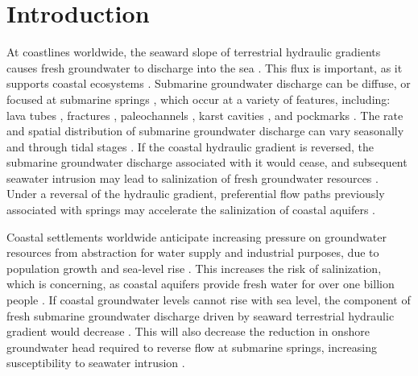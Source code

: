 \documentclass[pdflatex,sn-apa]{sn-jnl}%
\begin{document}
\section{Introduction}

At coastlines worldwide, the seaward slope of terrestrial hydraulic gradients causes fresh groundwater to discharge into the sea \citep{arevalo-martinez_ideas_2023, taniguchi_submarine_2019, moore_effect_2010}.
This flux is important, as it supports coastal ecosystems \citep{burnett_groundwater_2003, moore_effect_2010}.
Submarine groundwater discharge can be diffuse, or focused at submarine springs \citep{taniguchi_submarine_2019},
which occur at a variety of features, including: lava tubes \citep{swarzenski_observations_2017},
fractures \citep{bokuniewicz_direct_2008, taniguchi_temporal_2008}, paleochannels \citep{mulligan_role_2007},
karst cavities \citep{fleury_submarine_2007}, and pockmarks \citep{hoffmann_fresh_2023, schluter_spatial_2004}.
The rate and spatial distribution of submarine groundwater discharge can vary seasonally and through tidal stages \citep{taniguchi_submarine_2019, lee_submarine_2016, dulai_autonomous_2016}.
If the coastal hydraulic gradient is reversed, the submarine groundwater discharge associated with it would cease,
and subsequent seawater intrusion may lead to salinization of fresh groundwater resources \citep{werner_seawater_2013, taniguchi_submarine_2019}.
Under a reversal of the hydraulic gradient, preferential flow paths previously associated with springs may accelerate the salinization of coastal aquifers \citep{geng_preferential_2020, xu_long_2016, falls_hydrogeology_2005}.

Coastal settlements worldwide anticipate increasing pressure on groundwater resources from abstraction for water supply and industrial purposes, due to population growth and sea-level rise \citep{michael_science_2017, oude_essink_effects_2010}.
This increases the risk of salinization, which is concerning, as coastal aquifers provide fresh water for over one billion people  \citep{ferguson_vulnerability_2012}.
If coastal groundwater levels cannot rise with sea level, the component of fresh submarine groundwater discharge driven by seaward terrestrial hydraulic gradient would decrease \citep{morgan_sea-level_2024}.
This will also decrease the reduction in onshore groundwater head required to reverse flow at submarine springs,
increasing susceptibility to seawater intrusion \citep{werner_classification_2017}.
\end{document}
